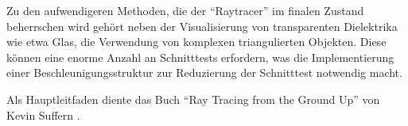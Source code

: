  Zu den aufwendigeren Methoden, die der "`Raytracer"'
 im finalen Zustand beherrschen wird gehört neben der Visualisierung von transparenten Dielektrika wie etwa Glas, die Verwendung von komplexen triangulierten Objekten. Diese können eine enorme Anzahl an Schnitttests erfordern, was die Implementierung einer Beschleunigungsstruktur zur Reduzierung der Schnitttest notwendig macht.
 
 
  Als Hauptleitfaden diente das Buch "`Ray Tracing from the Ground Up"' von Kevin Suffern \cite{suffern2007ray}.





%




%
%
 






